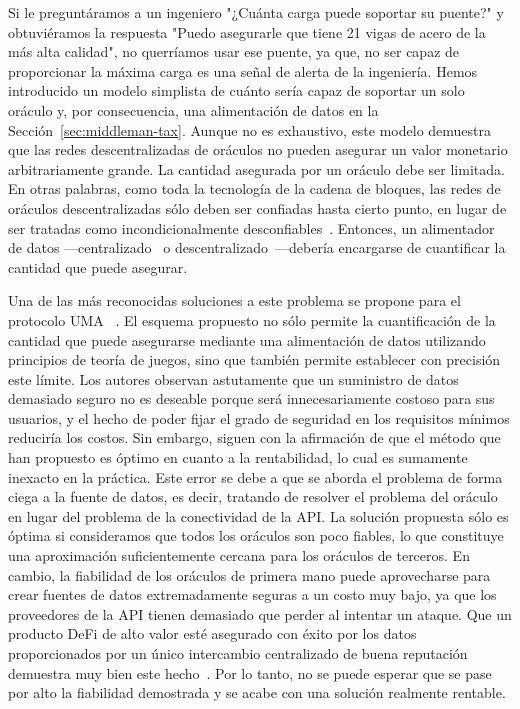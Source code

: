 \documentclass[11pt]{article}
\begin{document}
Si le preguntáramos a un ingeniero "¿Cuánta carga puede soportar su puente?" y obtuviéramos la respuesta "Puedo asegurarle que tiene 21 vigas de acero de la más alta calidad", no querríamos usar ese puente, ya que, no ser capaz de proporcionar la máxima carga es una señal de alerta de la ingeniería. Hemos introducido un modelo simplista de cuánto sería capaz de soportar un solo oráculo y, por consecuencia, una alimentación de datos en la Sección~\ref{sec:middleman-tax}.
Aunque no es exhaustivo, este modelo demuestra que las redes descentralizadas de oráculos no pueden asegurar un valor monetario arbitrariamente grande. La cantidad asegurada por un oráculo debe ser limitada. En otras palabras, como toda la tecnología de la cadena de bloques, las redes de oráculos descentralizadas sólo deben ser confiadas hasta cierto punto, en lugar de ser tratadas como incondicionalmente desconfiables~\cite{defilippi:2020}.
Entonces, un alimentador de datos —centralizado~\cite{coinbase} o descentralizado~\cite{ellis:2017}---debería encargarse de cuantificar la cantidad que puede asegurar.

Una de las más reconocidas soluciones a este problema se propone para el protocolo UMA ~\cite{uma:2020}.
El esquema propuesto no sólo permite la cuantificación de la cantidad que puede asegurarse mediante una alimentación de datos utilizando principios de teoría de juegos, sino que también permite establecer con precisión este límite. Los autores observan astutamente que un suministro de datos demasiado seguro no es deseable porque será innecesariamente costoso para sus usuarios, y el hecho de poder fijar el grado de seguridad en los requisitos mínimos reduciría los costos. Sin embargo, siguen con la afirmación de que el método que han propuesto es óptimo en cuanto a la rentabilidad, lo cual es sumamente inexacto en la práctica. Este error se debe a que se aborda el problema de forma ciega a la fuente de datos, es decir, tratando de resolver el problema del oráculo en lugar del problema de la conectividad de la API. La solución propuesta sólo es óptima si consideramos que todos los oráculos son poco fiables, lo que constituye una aproximación suficientemente cercana para los oráculos de terceros. En cambio, la fiabilidad de los oráculos de primera mano puede aprovecharse para crear fuentes de datos extremadamente seguras a un costo muy bajo, ya que los proveedores de la API tienen demasiado que perder al intentar un ataque. Que un producto DeFi de alto valor esté asegurado con éxito por los datos proporcionados por un único intercambio centralizado de buena reputación demuestra muy bien este hecho~\cite{coinbase}.
Por lo tanto, no se puede esperar que se pase por alto la fiabilidad demostrada y se acabe con una solución realmente rentable.
\end{document}
